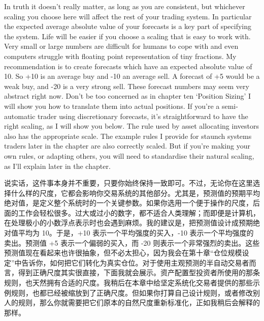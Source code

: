 \bipairgap

\begin{englishblock} In truth it doesn't really matter, as long as you are consistent, but whichever scaling you choose here will affect the rest of your trading system. In particular the expected average absolute value of your forecasts is a key part of specifying the system. Life will be easier if you choose a scaling that is easy to work with. Very small or large numbers are difficult for humans to cope with and even computers struggle with floating point representation of tiny fractions. My recommendation is to create forecasts which have an expected absolute value of 10. So +10 is an average buy and -10 an average sell. A forecast of +5 would be a weak buy, and -20 is a very strong sell. These forecast numbers may seem very abstract right now. Don't be too concerned as in chapter ten ‘Position Sizing' I will show you how to translate them into actual positions. If you're a semi-automatic trader using discretionary forecasts, it's straightforward to have the right scaling, as I will show you below. The rule used by asset allocating investors also has the appropriate scale. The example rules I provide for staunch systems traders later in the chapter are also correctly scaled. But if you're making your own rules, or adapting others, you will need to standardise their natural scaling, as I'll explain later in the chapter. \end{englishblock}

\begin{chineseblock}说实话，这件事本身并不重要，只要你始终保持一致即可。不过，无论你在这里选择什么样的尺度，它都会影响你交易系统的其他部分。尤其是，预测值的预期平均绝对值，是定义整个系统时的一个关键参数。如果你选用一个便于操作的尺度，后面的工作会轻松很多。过大或过小的数字，都不适合人类理解；而即便是计算机，在处理极小的小数浮点表示时也会遇到麻烦。我的建议是，把预测值设计成预期绝对值平均为 10。于是，+10 表示一个平均强度的买入，-10 表示一个平均强度的卖出。预测值 +5 表示一个偏弱的买入，而 -20 则表示一个非常强烈的卖出。这些预测值现在看起来也许很抽象，但不必太担心，因为我会在第十章“仓位规模设定”中告诉你，如何把它们转化为真实仓位。对于使用主观预测的半自动交易者而言，得到正确尺度其实很直接，下面我就会展示。资产配置型投资者所使用的那条规则，也天然拥有合适的尺度。我稍后在本章中给坚定系统化交易者提供的那些示例规则，也都已经被缩放到了正确尺度。但如果你打算自己设计规则，或者修改别人的规则，那么你就需要把它们原本的自然尺度重新标准化，正如我稍后会解释的那样。\end{chineseblock}

